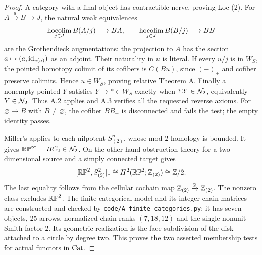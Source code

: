 \begin{proof}
A category with a final object has contractible nerve, proving Loc (2). For $A\xrightarrow{u}B\to J$, the natural weak equivalences
\[
 \operatorname*{hocolim}_{j\in J}B(A/j)\longrightarrow BA,\qquad
 \operatorname*{hocolim}_{j\in J}B(B/j)\longrightarrow BB
\]
are the Grothendieck augmentations: the projection to $A$ has the section $a\mapsto(a,\operatorname{id}_{v(a)})$ as an adjoint. Their naturality in $u$ is literal. If every $u/j$ is in $W_S$, the pointed homotopy colimit of its cofibers is $C(Bu)$, since $(-)_+$ and cofiber preserve colimits. Hence $u\in W_S$, proving relative Theorem A. Finally a nonempty pointed $Y$ satisfies $Y\to *\in W_S$ exactly when $\Sigma Y\in\mathcal N_2$, equivalently $Y\in\mathcal N_2$. Thus A.2 applies and A.3 verifies all the requested reverse axioms. For $\varnothing\to B$ with $B\ne\varnothing$, the cofiber $BB_+$ is disconnected and fails the test; the empty identity passes.

Miller's \cite[Theorem C, p.~40]{AMiller} applies to each nilpotent $S^n_{(2)}$, whose mod-$2$ homology is bounded. It gives $\mathbb{RP}^\infty=B C_2\in\mathcal N_2$. On the other hand obstruction theory for a two-dimensional source and a simply connected target gives
\[
 [\mathbb{RP}^2,S^2_{(2)}]_*\cong H^2(\mathbb{RP}^2;\mathbb Z_{(2)})\cong\mathbb Z/2.
\]
The last equality follows from the cellular cochain map $\mathbb Z_{(2)}\xrightarrow{2}\mathbb Z_{(2)}$. The nonzero class excludes $\mathbb{RP}^2$. The finite categorical model and its integer chain matrices are constructed and checked by \texttt{code/A\_finite\_categories.py}; it has seven objects, 25 arrows, normalized chain ranks $(7,18,12)$ and the single nonunit Smith factor $2$. Its geometric realization is the face subdivision of the disk attached to a circle by degree two. This proves the two asserted membership tests for actual functors in $\mathrm{Cat}$.
\end{proof}

